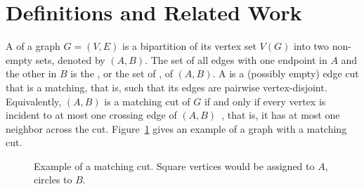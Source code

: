 \section{Definitions and Related Work}

A  of a graph $G = (V, E)$ is a bipartition of its vertex set $V(G)$ into two non-empty sets, denoted by $(A,B)$.
The set of all edges with one endpoint in $A$ and the other in $B$ is the , or the set of , of $(A,B)$.
A  is a (possibly empty) edge cut that is a matching, that is, such that its edges are pairwise vertex-disjoint. Equivalently, $(A, B)$ is a matching cut of $G$ if and only if every vertex is incident to at most one crossing edge of $(A, B)$~\citep{matching_cut_graham, chvatal_matching_cut}, that is, it has at most one neighbor across the cut.
Figure~\ref{fig:matching_cut} gives an example of a graph with a matching cut.


\begin{figure}[!htb]
        \centering
        \caption{Example of a matching cut. Square vertices would be assigned to $A$, circles to $B$.\label{fig:matching_cut}}
    \end{figure}


